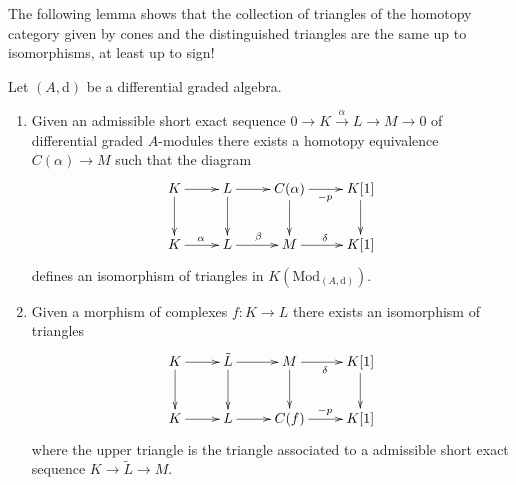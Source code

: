 \noindent
The following lemma shows that the collection of triangles of the homotopy
category given by cones and the distinguished triangles are the same
up to isomorphisms, at least up to sign!

\begin{lemma}
\label{lemma-the-same-up-to-isomorphisms}
Let $(A, \text{d})$ be a differential graded algebra.
\begin{enumerate}
\item Given an admissible short exact sequence
$0 \to K \xrightarrow{\alpha} L \to M \to 0$
of differential graded $A$-modules there exists a homotopy equivalence
$C(\alpha) \to M$ such that the diagram
$$
\xymatrix{
K \ar[r] \ar[d] & L \ar[d] \ar[r] &
C(\alpha) \ar[r]_{-p} \ar[d] & K[1] \ar[d] \\
K \ar[r]^\alpha & L \ar[r]^\beta &
M \ar[r]^\delta & K[1]
}
$$
defines an isomorphism of triangles in $K(\text{Mod}_{(A, \text{d})})$.
\item Given a morphism of complexes $f : K \to L$
there exists an isomorphism of triangles
$$
\xymatrix{
K \ar[r] \ar[d] & \tilde L \ar[d] \ar[r] &
M \ar[r]_{\delta} \ar[d] & K[1] \ar[d] \\
K \ar[r] & L \ar[r] &
C(f) \ar[r]^{-p} & K[1]
}
$$
where the upper triangle is the triangle associated to a
admissible short exact sequence $K \to \tilde L \to M$.
\end{enumerate}
\end{lemma}

